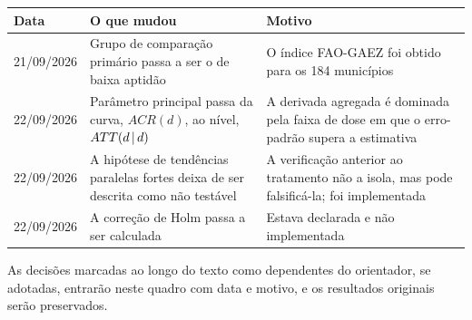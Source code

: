 \begin{quadro}[htb]
\centering
\caption{Desvios do plano de análise}
\label{qua:desvios}
\small
\begin{tabular}{|p{2.1cm}|p{5.2cm}|p{6.9cm}|}
\hline
\textbf{Data} & \textbf{O que mudou} & \textbf{Motivo} \\
\hline
21/09/2026 & Grupo de comparação primário passa a ser o de baixa aptidão
  & O índice FAO-GAEZ foi obtido para os 184 municípios \\
\hline
22/09/2026 & Parâmetro principal passa da curva, $ACR(d)$, ao nível, $ATT(d\,|\,d)$
  & A derivada agregada é dominada pela faixa de dose em que o erro-padrão
    supera a estimativa \\
\hline
22/09/2026 & A hipótese de tendências paralelas fortes deixa de ser descrita
  como não testável
  & A verificação anterior ao tratamento não a isola, mas pode falsificá-la;
    foi implementada \\
\hline
22/09/2026 & A correção de Holm passa a ser calculada
  & Estava declarada e não implementada \\
\hline
\end{tabular}
\end{quadro}

As decisões marcadas ao longo do texto como dependentes do orientador, se
adotadas, entrarão neste quadro com data e motivo, e os resultados originais
serão preservados.
